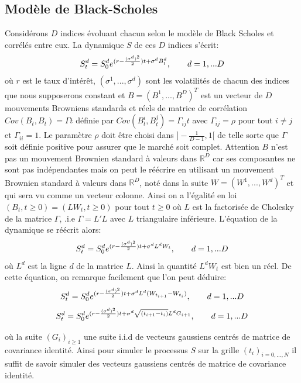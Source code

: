 \documentclass[french,12pt,a4paper]{article}
\begin{document}
\subsection{Modèle de Black-Scholes}
Considérons $D$ indices évoluant chacun selon le modèle de Black Scholes et corrélés entre eux. La dynamique $S$ de ces $D$ indices s'écrit:
$$ S_{t}^{d} = S_{0}^{d}e^{(r-\frac{(\sigma^{d})^{2}}{2})t+\sigma^{d}B_{t}^{d}}, \hspace{7 mm} d=1,...D$$
où $r$ est le taux d’intérêt, $(\sigma^{1},..., \sigma^	{d})$ sont les volatilités de chacun des indices que nous supposerons constant et $B = (B^{1},...,B^{D})^{T}$ est un vecteur de $D$ mouvements Browniens standards et réels de matrice de corrélation $Cov(B_{t},B_{t}) = \Gamma t$ définie par $Cov(B^{i}_{t} ,B^{j}_{t} ) = \Gamma_{ij}t$ avec $\Gamma_{ij} = \rho$ pour tout $i \neq j$ et $\Gamma_{ii} = 1$. Le paramètre $\rho$ doit être choisi dans $] -\frac{1}{D-1} , 1[$ de telle sorte que $\Gamma$ soit définie positive pour assurer que le marché soit complet. Attention $B$ n’est pas un mouvement Brownien standard à valeurs dans $\mathbb{R}^{D}$ car ses composantes ne sont pas indépendantes mais on peut le réécrire en utilisant un mouvement Brownien standard à valeurs dans $\mathbb{R}^{D}$, noté dans la suite $W = (W^{1}, . . . ,W^{d})^{T}$ et qui sera vu comme un vecteur colonne. Ainsi on a l’égalité en loi $(B_{t}, t \geq 0) = (LW_{t}, t \geq 0)$ pour tout $t \geq 0$ où $L$ est la factorisée de Cholesky de la matrice $\Gamma$, .i.e $\Gamma = L'L$ avec $L$ triangulaire inférieure. L’équation de la dynamique se réécrit alors:
$$ S_{t}^{d} = S_{0}^{d}e^{(r-\frac{(\sigma^{d})^{2}}{2})t+\sigma^{d}L^{d}W_{t}}, \hspace{7 mm} d=1,...D $$
où $L^{d}$ est la ligne $d$ de la matrice $L$. Ainsi la quantité $L^{d}W_{t}$ est bien un réel. De cette équation, on remarque facilement que l’on peut déduire:
$$ S_{t}^{d} = S_{0}^{d}e^{(r-\frac{(\sigma^{d})^{2}}{2})t+\sigma^{d}L^{d}(W_{t_{i+1}}-W_{t_{i}})}, \hspace{7 mm} d=1,...D $$
$$ S_{t}^{d} = S_{0}^{d}e^{(r-\frac{(\sigma^{d})^{2}}{2})t+\sigma^{d}\sqrt{(t_{i+1}-t_{i})}L^{d}G_{i+1}}, \hspace{7 mm} d=1,...D $$

où la suite $(G_{i})_{i \geq 1}$ une suite i.i.d de vecteurs gaussiens centrés de matrice de covariance identité. Ainsi pour simuler le processus $S$ sur la grille $(t_{i})_{i=0,...,N}$ il suffit de savoir simuler des vecteurs gaussiens centrés de matrice de covariance identité.\\
\end{document}
